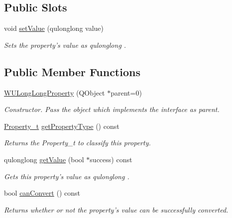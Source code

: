 \subsection*{Public Slots}
\begin{DoxyCompactItemize}
\item 
void \hyperlink{class_w_u_long_long_property_a88fb26420c3f7472f4499a7701ff9fc2}{set\-Value} (qulonglong value)
\begin{DoxyCompactList}\small\item\em Sets the property's value as qulonglong . \end{DoxyCompactList}\end{DoxyCompactItemize}
\subsection*{Public Member Functions}
\begin{DoxyCompactItemize}
\item 
\hyperlink{class_w_u_long_long_property_a6f66a9a2fb1b6157a7dab9e721511235}{W\-U\-Long\-Long\-Property} (Q\-Object $\ast$parent=0)
\begin{DoxyCompactList}\small\item\em Constructor. Pass the object which implements the interface as parent. \end{DoxyCompactList}\item 
\hyperlink{group___property_classes_ga38f1ccddda12c7cb50b868c9f789ee37}{Property\-\_\-t} \hyperlink{class_w_u_long_long_property_aca238d43cc34bc702e1b45858f9615a1}{get\-Property\-Type} () const 
\begin{DoxyCompactList}\small\item\em Returns the Property\-\_\-t to classify this property. \end{DoxyCompactList}\item 
qulonglong \hyperlink{class_w_u_long_long_property_aca6d125f5a4cd021ba353c2afd5ca31d}{get\-Value} (bool $\ast$success) const 
\begin{DoxyCompactList}\small\item\em Gets this property's value as qulonglong . \end{DoxyCompactList}\item 
bool \hyperlink{class_w_u_long_long_property_a35c48d980e5e28944a9521e80e89e592}{can\-Convert} () const 
\begin{DoxyCompactList}\small\item\em Returns whether or not the property's value can be successfully converted. \end{DoxyCompactList}\end{DoxyCompactItemize}
